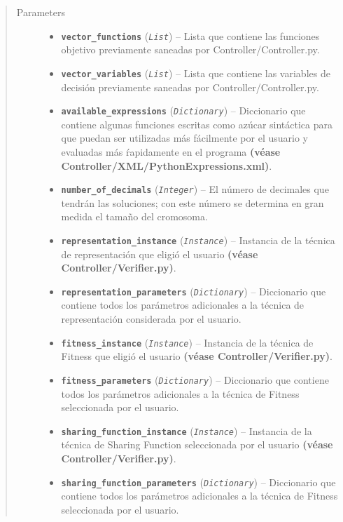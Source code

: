 \documentclass[class=report, crop=false]{standalone}
\begin{document}
\begin{fulllineitems}
\begin{quote}\begin{description}
\item[{Parameters}] \leavevmode\begin{itemize}
\item \textbf{\texttt{vector\_functions}} (\emph{\texttt{List}}) -- Lista que contiene las funciones objetivo previamente 
saneadas por Controller/Controller.py.
\item \textbf{\texttt{vector\_variables}} (\emph{\texttt{List}}) -- Lista que contiene las variables de decisión previamente 
saneadas por Controller/Controller.py.
\item \textbf{\texttt{available\_expressions}} (\emph{\texttt{Dictionary}}) -- Diccionario que contiene algunas funciones escritas como azúcar sintáctica
para que puedan ser utilizadas más fácilmente por el usuario y evaluadas
más ŕapidamente en el programa \textbf{(véase Controller/XML/PythonExpressions.xml)}.
\item \textbf{\texttt{number\_of\_decimals}} (\emph{\texttt{Integer}}) -- El número de decimales que tendrán las soluciones; con este número se determina
en gran medida el tamaño del cromosoma.
\item \textbf{\texttt{representation\_instance}} (\emph{\texttt{Instance}}) -- Instancia de la técnica de representación que eligió el usuario
\textbf{(véase Controller/Verifier.py)}.
\item \textbf{\texttt{representation\_parameters}} (\emph{\texttt{Dictionary}}) -- Diccionario que contiene todos los parámetros adicionales a la técnica
de representación considerada por el usuario.
\item \textbf{\texttt{fitness\_instance}} (\emph{\texttt{Instance}}) -- Instancia de la técnica de Fitness que eligió el usuario
\textbf{(véase Controller/Verifier.py)}.
\item \textbf{\texttt{fitness\_parameters}} (\emph{\texttt{Dictionary}}) -- Diccionario que contiene todos los parámetros adicionales a la técnica
de Fitness seleccionada por el usuario.
\item \textbf{\texttt{sharing\_function\_instance}} (\emph{\texttt{Instance}}) -- Instancia de la técnica de Sharing Function seleccionada por el usuario
\textbf{(véase Controller/Verifier.py)}.
\item \textbf{\texttt{sharing\_function\_parameters}} (\emph{\texttt{Dictionary}}) -- Diccionario que contiene todos los parámetros adicionales a la técnica
de Fitness seleccionada por el usuario.

\end{itemize}
\end{description}
\end{quote}
\end{fulllineitems}
\end{document}
